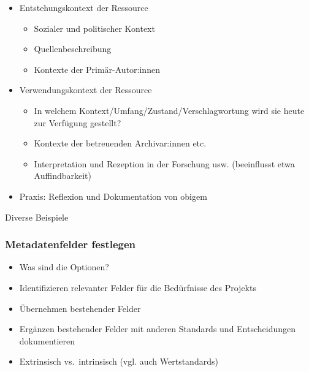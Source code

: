 \documentclass[
  letterpaper,
  DIV=11,
  numbers=noendperiod]{scrartcl}
\providecommand{\tightlist}{%
  \setlength{\itemsep}{0pt}\setlength{\parskip}{0pt}}\usepackage{longtable,booktabs,array}
\begin{document}
\begin{itemize}
\tightlist
\item
  Entstehungskontext der Ressource

  \begin{itemize}
  \tightlist
  \item
    Sozialer und politischer Kontext\\
  \item
    Quellenbeschreibung\\
  \item
    Kontexte der Primär-Autor:innen
  \end{itemize}
\item
  Verwendungskontext der Ressource

  \begin{itemize}
  \tightlist
  \item
    In welchem Kontext/Umfang/Zustand/Verschlagwortung wird sie heute
    zur Verfügung gestellt?
  \item
    Kontexte der betreuenden Archivar:innen etc.
  \item
    Interpretation und Rezeption in der Forschung usw. (beeinflusst etwa
    Auffindbarkeit)
  \end{itemize}
\item
  Praxis: Reflexion und Dokumentation von obigem
\end{itemize}

\begin{tcolorbox}[enhanced jigsaw, colbacktitle=quarto-callout-tip-color!10!white, rightrule=.15mm, coltitle=black, left=2mm, opacitybacktitle=0.6, toptitle=1mm, title=\textcolor{quarto-callout-tip-color}{\faLightbulb}\hspace{0.5em}{Beispiele}, colback=white, colframe=quarto-callout-tip-color-frame, opacityback=0, titlerule=0mm, leftrule=.75mm, breakable, bottomtitle=1mm, bottomrule=.15mm, arc=.35mm, toprule=.15mm]

Diverse Beispiele

\end{tcolorbox}

\subsubsection{Metadatenfelder
festlegen}\label{metadatenfelder-festlegen}

\begin{itemize}
\tightlist
\item
  Was sind die Optionen?
\item
  Identifizieren relevanter Felder für die Bedürfnisse des Projekts
\item
  Übernehmen bestehender Felder
\item
  Ergänzen bestehender Felder mit anderen Standards und Entscheidungen
  dokumentieren
\item
  Extrinsisch vs.~intrinsisch (vgl. auch Wertstandards)
\end{itemize}
\end{document}
